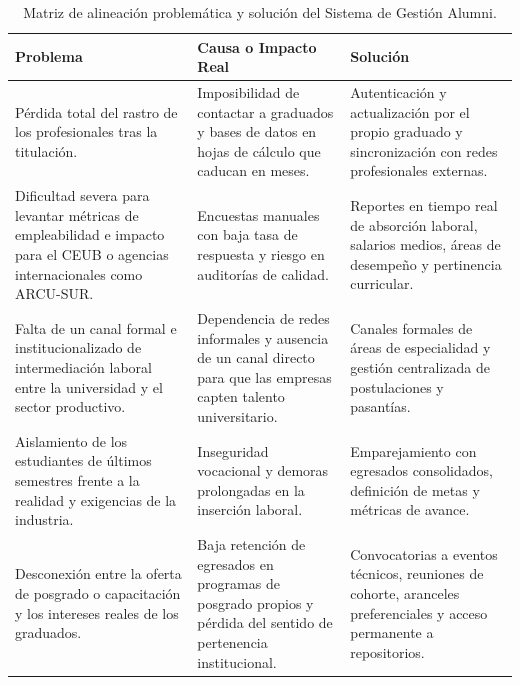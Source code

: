 \documentclass{./plantilla/umss}
\begin{document}
\begin{table}[htbp]
  \centering
  \small
  \renewcommand{\arraystretch}{1.35}
  \begin{tabular}{>{\raggedright\arraybackslash}p{} >{\raggedright\arraybackslash}p{} >{\raggedright\arraybackslash}p{}}
    \toprule
    \textbf{Problema} & \textbf{Causa o Impacto Real} & \textbf{Solución} \\
    \midrule
    Pérdida total del rastro de los profesionales tras la titulación. 
    & Imposibilidad de contactar a graduados y bases de datos en hojas de cálculo que caducan en meses. 
    & Autenticación y actualización por el propio graduado y sincronización con redes profesionales externas. \\
    \addlinespace
    Dificultad severa para levantar métricas de empleabilidad e impacto para el CEUB o agencias internacionales como ARCU-SUR. 
    & Encuestas manuales con baja tasa de respuesta y riesgo en auditorías de calidad. 
    & Reportes en tiempo real de absorción laboral, salarios medios, áreas de desempeño y pertinencia curricular. \\
    \addlinespace
    Falta de un canal formal e institucionalizado de intermediación laboral entre la universidad y el sector productivo. 
    & Dependencia de redes informales y ausencia de un canal directo para que las empresas capten talento universitario. 
    & Canales formales de áreas de especialidad y gestión centralizada de postulaciones y pasantías. \\
    \addlinespace
    Aislamiento de los estudiantes de últimos semestres frente a la realidad y exigencias de la industria. 
    & Inseguridad vocacional y demoras prolongadas en la inserción laboral. 
    & Emparejamiento con egresados consolidados, definición de metas y métricas de avance. \\
    \addlinespace
    Desconexión entre la oferta de posgrado o capacitación y los intereses reales de los graduados. 
    & Baja retención de egresados en programas de posgrado propios y pérdida del sentido de pertenencia institucional. 
    & Convocatorias a eventos técnicos, reuniones de cohorte, aranceles preferenciales y acceso permanente a repositorios. \\
    \bottomrule
  \end{tabular}
  \caption{Matriz de alineación problemática y solución del Sistema de Gestión Alumni.}
  \label{tab:problemas_soluciones}
\end{table}
\end{document}
